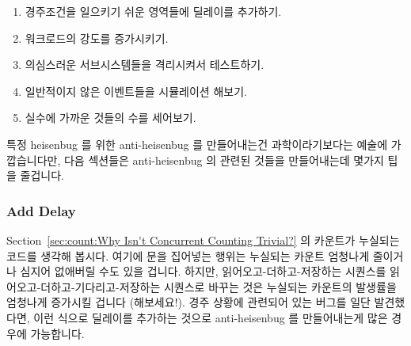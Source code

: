 \begin{enumerate}
\item	경주조건을 일으키기 쉬운 영역들에 딜레이를 추가하기.
\item	워크로드의 강도를 증가시키기.
\item	의심스러운 서브시스템들을 격리시켜서 테스트하기.
\item	일반적이지 않은 이벤트들을 시뮬레이션 해보기.
\item	실수에 가까운 것들의 수를 세어보기.

\end{enumerate}

특정 heisenbug 를 위한 anti-heisenbug 를 만들어내는건 과학이라기보다는 예술에
가깝습니다만, 다음 섹션들은 anti-heisenbug 의 관련된 것들을 만들어내는데 몇가지
팁을 줄겁니다.

\subsubsection{Add Delay}
\label{sec:debugging:Add Delay}

Section~\ref{sec:count:Why Isn't Concurrent Counting Trivial?} 의 카운트가
누실되는 코드를 생각해 봅시다.
여기에  문을 집어넣는 행위는 누실되는 카운트 엄청나게 줄이거나
심지어 없애버릴 수도 있을 겁니다.
하지만, 읽어오고-더하고-저장하는 시퀀스를 읽어오고-더하고-기다리고-저장하는
시퀀스로 바꾸는 것은 누실되는 카운트의 발생률을 엄청나게 증가시킬 겁니다
(해보세요!).
경주 상황에 관련되어 있는 버그를 일단 발견했다면, 이런 식으로 딜레이를 추가하는
것으로 anti-heisenbug 를 만들어내는게 많은 경우에 가능합니다.

